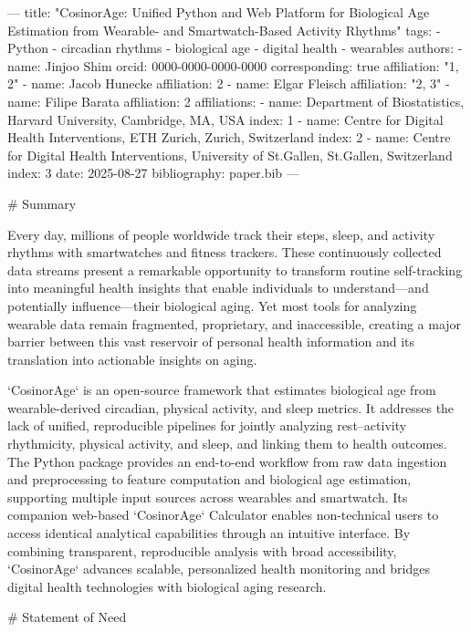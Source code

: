 ---
title: "CosinorAge: Unified Python and Web Platform for Biological Age Estimation from Wearable- and Smartwatch-Based Activity Rhythms"
tags:
  - Python
  - circadian rhythms
  - biological age
  - digital health
  - wearables
authors:
  - name: Jinjoo Shim
    orcid: 0000-0000-0000-0000
    corresponding: true
    affiliation: "1, 2"
  - name: Jacob Hunecke
    affiliation: 2
  - name: Elgar Fleisch
    affiliation: "2, 3"
  - name: Filipe Barata
    affiliation: 2
affiliations:
 - name: Department of Biostatistics, Harvard University, Cambridge, MA, USA
   index: 1
 - name: Centre for Digital Health Interventions, ETH Zurich, Zurich, Switzerland
   index: 2
 - name: Centre for Digital Health Interventions, University of St.Gallen, St.Gallen, Switzerland
   index: 3
date: 2025-08-27
bibliography: paper.bib
---

# Summary

Every day, millions of people worldwide track their steps, sleep, and activity rhythms with smartwatches and fitness trackers. These continuously collected data streams present a remarkable opportunity to transform routine self-tracking into meaningful health insights that enable individuals to understand—and potentially influence—their biological aging. Yet most tools for analyzing wearable data remain fragmented, proprietary, and inaccessible, creating a major barrier between this vast reservoir of personal health information and its translation into actionable insights on aging.

`CosinorAge` is an open-source framework that estimates biological age from wearable-derived circadian, physical activity, and sleep metrics. It addresses the lack of unified, reproducible pipelines for jointly analyzing rest–activity rhythmicity, physical activity, and sleep, and linking them to health outcomes. The Python package provides an end-to-end workflow from raw data ingestion and preprocessing to feature computation and biological age estimation, supporting multiple input sources across wearables and smartwatch. Its companion web-based `CosinorAge` Calculator enables non-technical users to access identical analytical capabilities through an intuitive interface. By combining transparent, reproducible analysis with broad accessibility, `CosinorAge` advances scalable, personalized health monitoring and bridges digital health technologies with biological aging research.

# Statement of Need

